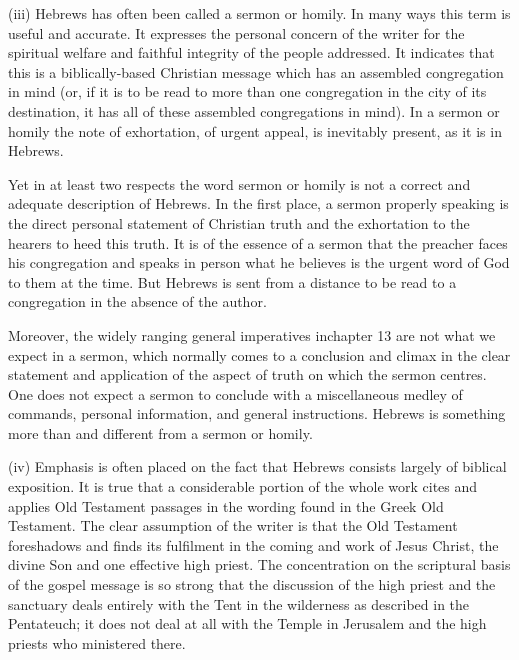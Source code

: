 (iii) Hebrews has often been called a sermon or homily.
In many ways this term is useful and accurate.
It expresses the personal concern of the writer for the spiritual welfare and
faithful integrity of the people addressed.
It indicates that this is a biblically-based Christian message which has an
assembled congregation in mind (or, if it is to be read to more than one
congregation in the city of its destination, it has all of these assembled
congregations in mind).
In a sermon or homily the note of exhortation, of urgent appeal, is inevitably
present, as it is in Hebrews.
\newline

Yet in at least two respects the word sermon or homily is not a correct and
adequate description of Hebrews.
In the first place, a sermon properly speaking is the direct personal statement
of Christian truth and the exhortation to the hearers to heed this truth.
It is of the essence of a sermon that the preacher faces his congregation and
speaks in person what he believes is the urgent word of God to them at the time.
But Hebrews is sent from a distance to be read to a congregation in the absence
of the author.
\newline

Moreover, the widely ranging general imperatives inchapter 13 are not what we
expect in a sermon, which normally comes to a conclusion and climax in the clear
statement and application of the aspect of truth on which the sermon centres.
One does not expect a sermon to conclude with a miscellaneous medley of
commands, personal information, and general instructions.
Hebrews is something more than and different from a sermon or homily.
\newline

(iv) Emphasis is often placed on the fact that Hebrews consists largely of
biblical exposition.
It is true that a considerable portion of the whole work cites and applies Old
Testament passages in the wording found in the Greek Old Testament.
The clear assumption of the writer is that the Old Testament foreshadows and
finds its fulfilment in the coming and work of Jesus Christ, the divine Son and
one effective high priest.
The concentration on the scriptural basis of the gospel message is so strong
that the discussion of the high priest and the sanctuary deals entirely with the
Tent in the wilderness as described in the Pentateuch; it does not deal at all
with the Temple in Jerusalem and the high priests who ministered there.
\newline

